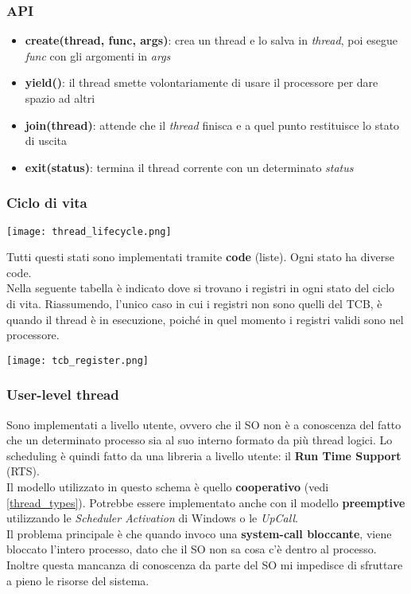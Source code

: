 \subsubsection{API}
\begin{itemize}
	\item \textbf{create(thread, func, args)}: crea un thread e lo salva in \emph{thread}, poi esegue \emph{func} con gli argomenti in \emph{args}
	\item \textbf{yield()}: il thread smette volontariamente di usare il processore per dare spazio ad altri
	\item \textbf{join(thread)}: attende che il \emph{thread} finisca e a quel punto restituisce lo stato di uscita
	\item \textbf{exit(status)}: termina il thread corrente con un determinato \emph{status} 
\end{itemize}

\subsubsection{Ciclo di vita}
\begin{center}
	\texttt{[image: thread\_lifecycle.png]}
\end{center}
Tutti questi stati sono implementati tramite \textbf{code} (liste). Ogni stato ha diverse code.\\

Nella seguente tabella è indicato dove si trovano i registri in ogni stato del ciclo di vita. Riassumendo, l'unico caso in cui i registri non sono quelli del TCB, è quando il thread è in esecuzione, poiché in quel momento i registri validi sono nel processore.
\begin{center}
	\texttt{[image: tcb\_register.png]}
\end{center}

\subsubsection{User-level thread}
Sono implementati a livello utente, ovvero che il SO non è a conoscenza del fatto che un determinato processo sia al suo interno formato da più thread logici. Lo scheduling è quindi fatto da una libreria a livello utente: il \textbf{Run Time Support} (RTS).\\
Il modello utilizzato in questo schema è quello \textbf{cooperativo} (vedi \ref{thread_types}). Potrebbe essere implementato anche con il modello \textbf{preemptive} utilizzando le \emph{Scheduler Activation} di Windows o le \emph{UpCall}.\\
Il problema principale è che quando invoco una \textbf{system-call bloccante}, viene bloccato l'intero processo, dato che il SO non sa cosa c'è dentro al processo. Inoltre questa mancanza di conoscenza da parte del SO mi impedisce di sfruttare a pieno le risorse del sistema.